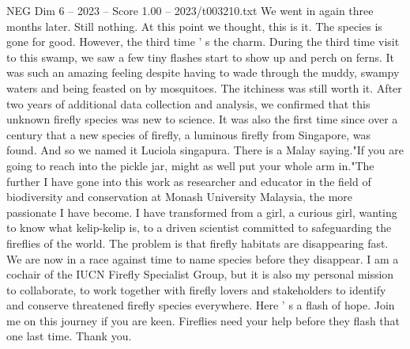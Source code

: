 \begin{textsample}{NEG Dim 6 – 2023 – Score 1.00 – 2023/t003210.txt}
We went in again three months later.
Still nothing.
At this point we thought, this is it.
The species is gone for good.
However, the third time ' s the charm.
During the third time visit to this swamp, we saw a few tiny flashes start to show up and perch on ferns.
It was such an amazing feeling despite having to wade through the muddy, swampy waters and being feasted on by mosquitoes.
The itchiness was still worth it.
After two years of additional data collection and analysis, we confirmed that this unknown firefly species was new to science.
It was also the first time since over a century that a new species of firefly, a luminous firefly from Singapore, was found.
And so we named it Luciola singapura.
There is a Malay saying."If you are going to reach into the pickle jar, might as well put your whole arm in."The further I have gone into this work as researcher and educator in the field of biodiversity and conservation at Monash University Malaysia, the more passionate I have become.
I have transformed from a girl, a curious girl, wanting to know what kelip-kelip is, to a driven scientist committed to safeguarding the fireflies of the world.
The problem is that firefly habitats are disappearing fast.
We are now in a race against time to name species before they disappear.
I am a cochair of the IUCN Firefly Specialist Group, but it is also my personal mission to collaborate, to work together with firefly lovers and stakeholders to identify and conserve threatened firefly species everywhere.
Here ' s a flash of hope.
Join me on this journey if you are keen.
Fireflies need your help before they flash that one last time.
Thank you.

\end{textsample}
